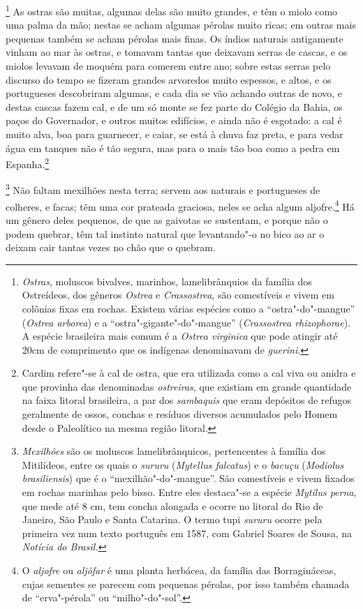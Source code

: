 \footnote{ \textit{Ostras}, moluscos bivalves,
marinhos, lamelibrânquios da família dos Ostreídeos, dos gêneros
\textit{Ostrea} e \textit{Crassostrea}, são comestíveis e vivem em
colônias fixas em rochas. Existem várias espécies como a
``ostra"-do"-mangue'' (\textit{Ostrea arborea}) e a ``ostra"-gigante"-do"-mangue'' 
(\textit{Crassostrea rhizophorae}). A espécie
brasileira mais comum é a \textit{Ostrea virginica} que pode atingir
até 20cm de comprimento que os indígenas denominavam de \textit{guerini}.} 
As ostras são muitas, algumas delas são muito grandes,
e têm o miolo como uma palma da mão; nestas se acham algumas pérolas
muito ricas; em outras mais pequenas também se acham pérolas mais
finas. Os índios naturais antigamente vinham ao mar às ostras, e
tomavam tantas que deixavam serras de cascas, e os miolos levavam de
moquém para comerem entre ano; sobre estas serras pelo discurso do
tempo se fizeram grandes arvoredos muito espessos, e altos, e os
portugueses descobriram algumas, e cada dia se vão achando outras de
novo, e destas cascas fazem cal, e de um só monte se fez parte do
Colégio da Bahia, os paços do Governador, e outros muitos edifícios, e
ainda não é esgotado: a cal é muito alva, boa para guarnecer, e caiar,
se está à chuva faz preta, e para vedar água em tanques não é tão
segura, mas para o mais tão boa como a pedra em Espanha.\footnote{ Cardim 
refere"-se à cal de ostra, que era utilizada como a cal viva ou
anidra e que provinha das denominadas \textit{ostreiras}, que existiam
em grande quantidade na faixa litoral brasileira, a par dos
\textit{sambaquis} que eram depósitos de refugos geralmente de ossos,
conchas e resíduos diversos acumulados pelo Homem desde o Paleolítico
na mesma região litoral.} 

\footnote{ \textit{Mexilhões} são os moluscos
lamelibrânquicos, pertencentes à família dos Mitilídeos, entre os quais
o \textit{sururu} (\textit{Mytellus falcatus}) e o \textit{bacuçu} (\textit{Modiolus
brasiliensis}) que é o ``mexilhão"-do"-mangue''. São comestíveis e vivem
fixados em rochas marinhas pelo bisso. Entre eles destaca"-se a espécie
\textit{Mytilus perna}, que mede até 8 cm, tem concha alongada e ocorre
no litoral do Rio de Janeiro, São Paulo e Santa Catarina. O termo tupi
\textit{sururu} ocorre pela primeira vez num texto português em 1587,
com Gabriel Soares de Sousa, na \textit{Notícia do Brasil.}} 
Não faltam mexilhões nesta terra; servem aos naturais e portugueses de
colheres, e facas; têm uma cor prateada graciosa, neles se acha algum
aljofre.\footnote{ O \textit{aljofre} ou \textit{aljôfar} é uma planta
herbácea, da família das Borragináceas, cujas sementes se parecem com
pequenas pérolas, por isso também chamada de ``erva"-pérola'' ou
``milho"-do"-sol''.} Há um gênero deles pequenos, de que as gaivotas se
sustentam, e porque não o podem quebrar, têm tal instinto natural que
levantando"-o no bico ao ar o deixam cair tantas vezes no chão que o quebram. 

